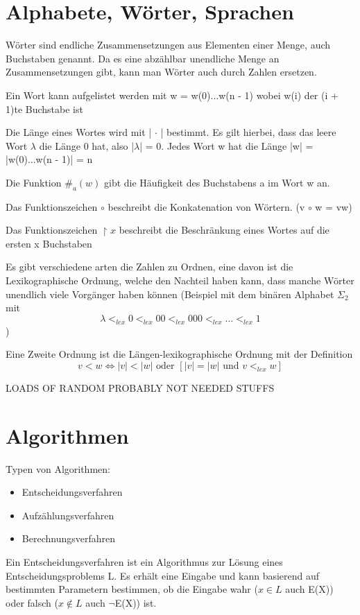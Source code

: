 \documentclass[12pt,a4paper]{article} %
\begin{document}
	\tableofcontents
	
	\newpage
	\section{Alphabete, Wörter, Sprachen}
	Wörter sind endliche Zusammensetzungen aus Elementen einer Menge, auch Buchstaben genannt. Da es eine abzählbar unendliche Menge an Zusammensetzungen gibt, kann man Wörter auch durch Zahlen ersetzen. 
	
	Ein Wort kann aufgelistet werden mit w = w(0)...w(n - 1) wobei w(i) der (i + 1)te Buchstabe ist
	
	Die Länge eines Wortes wird mit | $\cdot$ | bestimmt. Es gilt hierbei, dass das leere Wort $\lambda$ die Länge 0 hat, also |$\lambda$| = 0. Jedes Wort w hat die Länge |w| = |w(0)...w(n - 1)| = n
	
	Die Funktion $\#_a(w)$ gibt die Häufigkeit des Buchstabens a im Wort w an.
	
	Das Funktionszeichen $\circ$ beschreibt die Konkatenation von Wörtern. (v $\circ$ w = vw)
	
	Das Funktionszeichen $\upharpoonright x$ beschreibt die Beschränkung eines Wortes auf die ersten x Buchstaben
	
	Es gibt verschiedene arten die Zahlen zu Ordnen, eine davon ist die Lexikographische Ordnung, welche den Nachteil haben kann, dass manche Wörter unendlich viele Vorgänger haben können (Beispiel mit dem binären Alphabet $\Sigma_2$ mit \[\lambda <_{lex} 0 <_{lex} 00 <_{lex} 000 <_{lex} ... <_{lex} 1\])
	
	Eine Zweite Ordnung ist die Längen-lexikographische Ordnung mit der Definition \[v < w \Leftrightarrow |v| < |w| \text{ oder } [|v| = |w| \text{ und } v <_{lex} w]\]
	
	LOADS OF RANDOM PROBABLY NOT NEEDED STUFFS
	
	\section{Algorithmen}
	
	Typen von Algorithmen:
	\begin{itemize}
		\item Entscheidungsverfahren
		\item Aufzählungsverfahren
		\item Berechnungsverfahren
	\end{itemize}
	
	Ein Entscheidungsverfahren ist ein Algorithmus zur Lösung eines Entscheidungsproblems L. Es erhält eine Eingabe und kann basierend auf bestimmten Parametern bestimmen, ob die Eingabe wahr ($x \in L$ auch E(X)) oder falsch ($x \notin L$ auch $\neg$E(X)) ist. 
	
\end{document}
